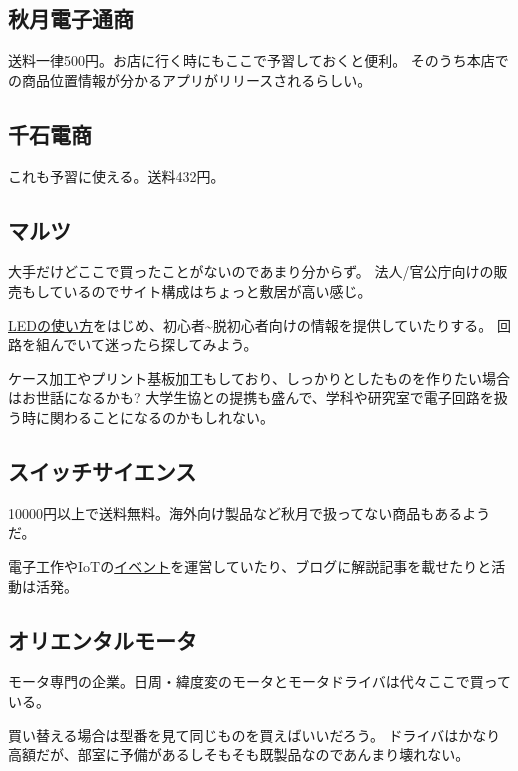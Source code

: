 \documentclass[letterpaper,10pt,dvipdfmx]{sphinxmanual}
\begin{document}
\subsection{秋月電子通商}
\label{\detokenize{begginers/buy_parts:id14}}
送料一律500円。お店に行く時にもここで予習しておくと便利。
そのうち本店での商品位置情報が分かるアプリがリリースされるらしい。


\subsection{千石電商}
\label{\detokenize{begginers/buy_parts:id15}}
これも予習に使える。送料432円。


\subsection{マルツ}
\label{\detokenize{begginers/buy_parts:id16}}
大手だけどここで買ったことがないのであまり分からず。
法人/官公庁向けの販売もしているのでサイト構成はちょっと敷居が高い感じ。

\href{http://www.marutsu.co.jp/pc/static/large\_order/led}{LEDの使い方}をはじめ、初心者\textasciitilde{}脱初心者向けの情報を提供していたりする。
回路を組んでいて迷ったら探してみよう。

ケース加工やプリント基板加工もしており、しっかりとしたものを作りたい場合はお世話になるかも?
大学生協との提携も盛んで、学科や研究室で電子回路を扱う時に関わることになるのかもしれない。


\subsection{スイッチサイエンス}
\label{\detokenize{begginers/buy_parts:id17}}
10000円以上で送料無料。海外向け製品など秋月で扱ってない商品もあるようだ。

電子工作やIoTの\href{https://connpass.com/search/?q=\%E3\%82\%B9\%E3\%82\%A4\%E3\%83\%83\%E3\%83\%81\%E3\%82\%B5\%E3\%82\%A4\%E3\%82\%A8\%E3\%83\%B3\%E3\%82\%B9}{イベント}を運営していたり、ブログに解説記事を載せたりと活動は活発。


\subsection{オリエンタルモータ}
\label{\detokenize{begginers/buy_parts:id18}}
モータ専門の企業。日周・緯度変のモータとモータドライバは代々ここで買っている。

買い替える場合は型番を見て同じものを買えばいいだろう。
ドライバはかなり高額だが、部室に予備があるしそもそも既製品なのであんまり壊れない。
\end{document}
